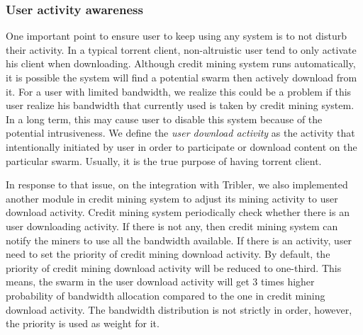 \subsubsection{User activity awareness}
\label{section:uactivityimpl}
One important point to ensure user to keep using any system is to not disturb their activity. In a typical torrent client, non-altruistic user tend to only activate his client when downloading. Although credit mining system runs automatically, it is possible the system will find a potential swarm then actively download from it. For a user with limited bandwidth, we realize this could be a problem if this user realize his bandwidth that currently used is taken by credit mining system. In a long term, this may cause user to disable this system because of the potential intrusiveness. We define the \textit{user download activity} as the activity that intentionally initiated by user in order to participate or download content on the particular swarm. Usually, it is the true purpose of having torrent client. 

In response to that issue, on the integration with Tribler, we also implemented another module in credit mining system to adjust its mining activity to user download activity. Credit mining system periodically check whether there is an user downloading activity. If there is not any, then credit mining system can notify the miners to use all the bandwidth available. If there is an activity, user need to set the priority of credit mining download activity. By default, the priority of credit mining download activity will be reduced to one-third. This means, the swarm in the user download activity will get 3 times higher probability of bandwidth allocation compared to the one in credit mining download activity. The bandwidth distribution is not strictly in order, however, the priority is used as weight for it.



